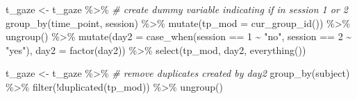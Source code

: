 \documentclass[
]{article}
\newenvironment{Shaded}{\begin{snugshade}}{\end{snugshade}}
\newcommand{\AttributeTok}[1]{\textcolor[rgb]{0.77,0.63,0.00}{#1}}
\newcommand{\CommentTok}[1]{\textcolor[rgb]{0.56,0.35,0.01}{\textit{#1}}}
\newcommand{\DecValTok}[1]{\textcolor[rgb]{0.00,0.00,0.81}{#1}}
\newcommand{\FunctionTok}[1]{\textcolor[rgb]{0.00,0.00,0.00}{#1}}
\newcommand{\NormalTok}[1]{#1}
\newcommand{\OtherTok}[1]{\textcolor[rgb]{0.56,0.35,0.01}{#1}}
\newcommand{\SpecialCharTok}[1]{\textcolor[rgb]{0.00,0.00,0.00}{#1}}
\newcommand{\StringTok}[1]{\textcolor[rgb]{0.31,0.60,0.02}{#1}}
\begin{document}
\begin{Shaded}
\begin{Highlighting}[]
\NormalTok{t\_gaze }\OtherTok{\textless{}{-}}\NormalTok{ t\_gaze }\SpecialCharTok{\%\textgreater{}\%}
  \CommentTok{\# create dummy variable indicating if in session 1 or 2}
  \FunctionTok{group\_by}\NormalTok{(time\_point, session) }\SpecialCharTok{\%\textgreater{}\%} 
  \FunctionTok{mutate}\NormalTok{(}\AttributeTok{tp\_mod =} \FunctionTok{cur\_group\_id}\NormalTok{()) }\SpecialCharTok{\%\textgreater{}\%}
  \FunctionTok{ungroup}\NormalTok{() }\SpecialCharTok{\%\textgreater{}\%} 
  \FunctionTok{mutate}\NormalTok{(}\AttributeTok{day2 =} \FunctionTok{case\_when}\NormalTok{(session }\SpecialCharTok{==} \DecValTok{1} \SpecialCharTok{\textasciitilde{}} \StringTok{"no"}\NormalTok{,}
\NormalTok{                          session }\SpecialCharTok{==} \DecValTok{2} \SpecialCharTok{\textasciitilde{}} \StringTok{"yes"}\NormalTok{),}
         \AttributeTok{day2 =} \FunctionTok{factor}\NormalTok{(day2)) }\SpecialCharTok{\%\textgreater{}\%}
  \FunctionTok{select}\NormalTok{(tp\_mod, day2, }\FunctionTok{everything}\NormalTok{())}

\NormalTok{t\_gaze }\OtherTok{\textless{}{-}}\NormalTok{ t\_gaze }\SpecialCharTok{\%\textgreater{}\%}
  \CommentTok{\# remove duplicates created by day2}
  \FunctionTok{group\_by}\NormalTok{(subject) }\SpecialCharTok{\%\textgreater{}\%}
  \FunctionTok{filter}\NormalTok{(}\SpecialCharTok{!}\FunctionTok{duplicated}\NormalTok{(tp\_mod)) }\SpecialCharTok{\%\textgreater{}\%}   
  \FunctionTok{ungroup}\NormalTok{() }
\end{Highlighting}
\end{Shaded}
\end{document}
